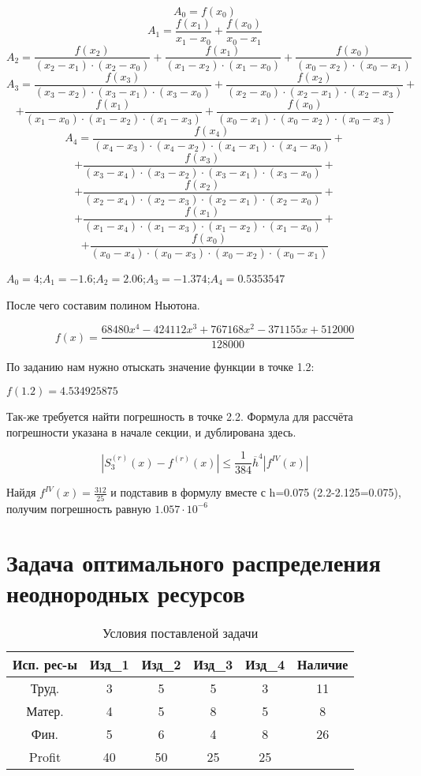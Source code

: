 \documentclass[russian,utf8,nocolumnxxxi,nocolumnxxxii]{eskdtext}
\begin{document}
   $$A_0=f(x_0)$$
   \vspace{20pt}
   $$A_1=\frac{f(x_1)}{x_1-x_0}+\frac{f(x_0)}{x_0-x_1}$$
   \vspace{20pt}
   $$A_2=\frac{f(x_2)}{(x_2-x_1) \cdot (x_2-x_0)} + \frac{f(x_1)}{(x_1-x_2) \cdot (x_1-x_0)} + \frac{f(x_0)}{(x_0-x_2) \cdot (x_0-x_1)}$$
   \vspace{20pt}
   $$A_3=\frac{f(x_3)}{(x_3-x_2) \cdot (x_3-x_1) \cdot (x_3-x_0)} + \frac{f(x_2)}{(x_2-x_0) \cdot (x_2-x_1) \cdot (x_2-x_3)} +$$ 
   $$+ \frac{f(x_1)}{(x_1-x_0) \cdot (x_1-x_2) \cdot (x_1-x_3)} + \frac{f(x_0)}{(x_0-x_1) \cdot (x_0-x_2) \cdot (x_0-x_3)}$$
   \vspace{20pt}
   $$A_4=\frac{f(x_4)}{(x_4-x_3) \cdot (x_4-x_2) \cdot (x_4-x_1) \cdot (x_4-x_0)} +$$
   $$+ \frac{f(x_3)}{(x_3-x_4) \cdot (x_3-x_2) \cdot (x_3-x_1) \cdot (x_3-x_0)} +$$
   $$+ \frac{f(x_2)}{(x_2-x_4) \cdot (x_2-x_3) \cdot (x_2-x_1) \cdot (x_2-x_0)} +$$
   $$+ \frac{f(x_1)}{(x_1-x_4) \cdot (x_1-x_3) \cdot (x_1-x_2) \cdot (x_1-x_0)} +$$
   $$+ \frac{f(x_0)}{(x_0-x_4) \cdot (x_0-x_3) \cdot (x_0-x_2) \cdot (x_0-x_1)}$$
   
   \vspace{20pt}
   
   $A_0=4$;$A_1=-1.6$;$A_2=2.06$;$A_3=-1.374$;$A_4=0.5353547$
   
   \newpage
   
   После чего составим полином Ньютона.
   
   $$f(x)=\frac{68480x^4-424112x^3+767168x^2-371155x+512000}{128000}$$
   
   По заданию нам нужно отыскать значение функции в точке 1.2:
   
   $f(1.2)=4.534925875$
   
   Так-же требуется найти погрешность в точке 2.2. Формула для рассчёта погрешности указана в начале секции, и дублирована здесь.
   
    $$|S_3^{(r)}(x)-f^{(r)}(x)|\leqslant \frac{1}{384}\overline{h}^4|f^{IV}(x)|$$
    
    Найдя $f^{IV}(x) = \frac{312}{25}$ и подставив в формулу вместе с h=0.075 (2.2-2.125=0.075), получим погрешность равную $1.057 \cdot 10^{-6}$
    
    \newpage
    \section{Задача оптимального распределения неоднородных ресурсов}
    
   
        \begin{table}[h]
        \centering
     \caption{Условия поставленой задачи}
\begin{tabular}[c]{|*{6}{c|}}
\hline
Исп. рес-ы & Изд_1 & Изд_2 & Изд_3 & Изд_4 & Наличие\\
\hline
Труд. & 3 & 5 & 5 & 3 & 11\\
\hline
Матер. & 4 & 5 & 8 & 5 & 8\\
\hline
Фин. & 5 & 6 & 4 & 8 & 26\\
\hline
Profit & 40 & 50 & 25 & 25\\
\hline
\end{tabular}
\end{table}
\end{document}
